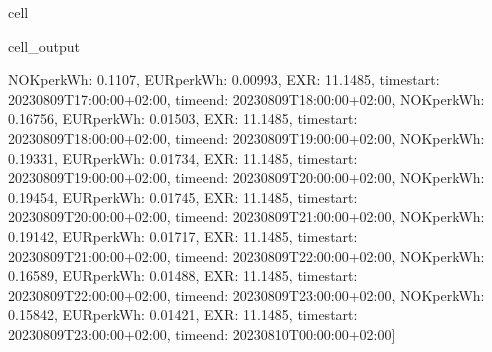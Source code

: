 \documentclass[letterpaper,10pt,english]{jupyterBook}
\begin{document}
\begin{sphinxuseclass}{cell}
\begin{sphinxVerbatimOutput}
\begin{sphinxuseclass}{cell_output}
\begin{sphinxVerbatim}[commandchars=\\\{\}]
\PYGZob{}\PYGZsq{}NOK\PYGZus{}per\PYGZus{}kWh\PYGZsq{}: 0.1107, \PYGZsq{}EUR\PYGZus{}per\PYGZus{}kWh\PYGZsq{}: 0.00993, \PYGZsq{}EXR\PYGZsq{}: 11.1485, \PYGZsq{}time\PYGZus{}start\PYGZsq{}: \PYGZsq{}2023\PYGZhy{}08\PYGZhy{}09T17:00:00+02:00\PYGZsq{}, \PYGZsq{}time\PYGZus{}end\PYGZsq{}: \PYGZsq{}2023\PYGZhy{}08\PYGZhy{}09T18:00:00+02:00\PYGZsq{}\PYGZcb{}, \PYGZob{}\PYGZsq{}NOK\PYGZus{}per\PYGZus{}kWh\PYGZsq{}: 0.16756, \PYGZsq{}EUR\PYGZus{}per\PYGZus{}kWh\PYGZsq{}: 0.01503, \PYGZsq{}EXR\PYGZsq{}: 11.1485, \PYGZsq{}time\PYGZus{}start\PYGZsq{}: \PYGZsq{}2023\PYGZhy{}08\PYGZhy{}09T18:00:00+02:00\PYGZsq{}, \PYGZsq{}time\PYGZus{}end\PYGZsq{}: \PYGZsq{}2023\PYGZhy{}08\PYGZhy{}09T19:00:00+02:00\PYGZsq{}\PYGZcb{}, \PYGZob{}\PYGZsq{}NOK\PYGZus{}per\PYGZus{}kWh\PYGZsq{}: 0.19331, \PYGZsq{}EUR\PYGZus{}per\PYGZus{}kWh\PYGZsq{}: 0.01734, \PYGZsq{}EXR\PYGZsq{}: 11.1485, \PYGZsq{}time\PYGZus{}start\PYGZsq{}: \PYGZsq{}2023\PYGZhy{}08\PYGZhy{}09T19:00:00+02:00\PYGZsq{}, \PYGZsq{}time\PYGZus{}end\PYGZsq{}: \PYGZsq{}2023\PYGZhy{}08\PYGZhy{}09T20:00:00+02:00\PYGZsq{}\PYGZcb{}, \PYGZob{}\PYGZsq{}NOK\PYGZus{}per\PYGZus{}kWh\PYGZsq{}: 0.19454, \PYGZsq{}EUR\PYGZus{}per\PYGZus{}kWh\PYGZsq{}: 0.01745, \PYGZsq{}EXR\PYGZsq{}: 11.1485, \PYGZsq{}time\PYGZus{}start\PYGZsq{}: \PYGZsq{}2023\PYGZhy{}08\PYGZhy{}09T20:00:00+02:00\PYGZsq{}, \PYGZsq{}time\PYGZus{}end\PYGZsq{}: \PYGZsq{}2023\PYGZhy{}08\PYGZhy{}09T21:00:00+02:00\PYGZsq{}\PYGZcb{}, \PYGZob{}\PYGZsq{}NOK\PYGZus{}per\PYGZus{}kWh\PYGZsq{}: 0.19142, \PYGZsq{}EUR\PYGZus{}per\PYGZus{}kWh\PYGZsq{}: 0.01717, \PYGZsq{}EXR\PYGZsq{}: 11.1485, \PYGZsq{}time\PYGZus{}start\PYGZsq{}: \PYGZsq{}2023\PYGZhy{}08\PYGZhy{}09T21:00:00+02:00\PYGZsq{}, \PYGZsq{}time\PYGZus{}end\PYGZsq{}: \PYGZsq{}2023\PYGZhy{}08\PYGZhy{}09T22:00:00+02:00\PYGZsq{}\PYGZcb{}, \PYGZob{}\PYGZsq{}NOK\PYGZus{}per\PYGZus{}kWh\PYGZsq{}: 0.16589, \PYGZsq{}EUR\PYGZus{}per\PYGZus{}kWh\PYGZsq{}: 0.01488, \PYGZsq{}EXR\PYGZsq{}: 11.1485, \PYGZsq{}time\PYGZus{}start\PYGZsq{}: \PYGZsq{}2023\PYGZhy{}08\PYGZhy{}09T22:00:00+02:00\PYGZsq{}, \PYGZsq{}time\PYGZus{}end\PYGZsq{}: \PYGZsq{}2023\PYGZhy{}08\PYGZhy{}09T23:00:00+02:00\PYGZsq{}\PYGZcb{}, \PYGZob{}\PYGZsq{}NOK\PYGZus{}per\PYGZus{}kWh\PYGZsq{}: 0.15842, \PYGZsq{}EUR\PYGZus{}per\PYGZus{}kWh\PYGZsq{}: 0.01421, \PYGZsq{}EXR\PYGZsq{}: 11.1485, \PYGZsq{}time\PYGZus{}start\PYGZsq{}: \PYGZsq{}2023\PYGZhy{}08\PYGZhy{}09T23:00:00+02:00\PYGZsq{}, \PYGZsq{}time\PYGZus{}end\PYGZsq{}: \PYGZsq{}2023\PYGZhy{}08\PYGZhy{}10T00:00:00+02:00\PYGZsq{}\PYGZcb{}]
\end{sphinxVerbatim}

\end{sphinxuseclass}\end{sphinxVerbatimOutput}

\end{sphinxuseclass}
\end{document}
